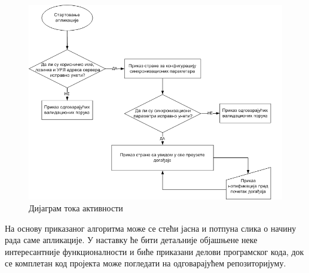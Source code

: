 \begin{figure}[H]
	\centering
	\includegraphics[scale=0.5]{slike/tok_aktivnosti.png}
	\caption{Дијаграм тока активности}
	\label{fig:application_alogorithm}
\end{figure}

На основу приказаног алгоритма  може се стећи јасна и потпуна слика о начину рада саме апликације. У наставку ће бити детаљније објашњене неке интересантније функционалности и биће приказани делови програмског кода, док се комплетан код пројекта може погледати на одговарајућем репозиторијуму\cite{svn_repo}.
